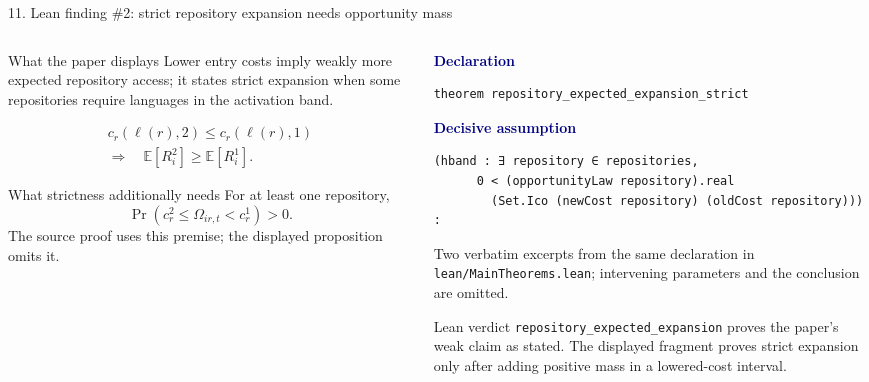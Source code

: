 \documentclass[aspectratio=169,10pt]{beamer}
\newcommand{\source}[1]{\textcolor{Slate}{\scriptsize #1}}
\begin{document}
\begin{frame}[fragile]{11. Lean finding \#2: strict repository expansion needs opportunity mass}
  \vspace{-0.08cm}
  \begin{columns}[T,onlytextwidth]
    \begin{column}{0.43\textwidth}
      \begin{block}{What the paper displays}
        \scriptsize Lower entry costs imply weakly more expected repository access; it states strict expansion when some repositories require languages in the activation band.
      \end{block}

      \vspace{-0.10cm}
      {\small\[
        \begin{gathered}
          c_r(\ell(r),2)\le c_r(\ell(r),1)\\[-0.04cm]
          \Longrightarrow\quad \mathbb E[R_i^2]\ge\mathbb E[R_i^1].
        \end{gathered}
      \]}
      \vspace{-0.10cm}

      \begin{alertblock}{What strictness additionally needs}
        \scriptsize For at least one repository,
        \[
          \Pr\!\left(c_r^2\le\Omega_{ir,t}<c_r^1\right)>0.
        \]
        The source proof uses this premise; the displayed proposition omits it.
      \end{alertblock}
    \end{column}
    \begin{column}{0.53\textwidth}
      \textcolor{Navy}{\scriptsize\bfseries Declaration}
\begin{lstlisting}[basicstyle=\ttfamily\fontsize{8.0}{8.8}\selectfont]
theorem repository_expected_expansion_strict
\end{lstlisting}
      \vspace{0.05cm}
      \textcolor{Navy}{\scriptsize\bfseries Decisive assumption}
\begin{lstlisting}[basicstyle=\ttfamily\fontsize{7.4}{8.2}\selectfont]
    (hband : ∃ repository ∈ repositories,
      0 < (opportunityLaw repository).real
        (Set.Ico (newCost repository) (oldCost repository))) :
\end{lstlisting}
      \source{Two verbatim excerpts from the same declaration in \texttt{lean/MainTheorems.lean}; intervening parameters and the conclusion are omitted.}

      \begin{exampleblock}{Lean verdict}
        \scriptsize
        \texttt{repository\_expected\_expansion} proves the paper's weak claim as stated. The displayed fragment proves strict expansion only after adding positive mass in a lowered-cost interval.
      \end{exampleblock}
    \end{column}
  \end{columns}
\end{frame}
\end{document}
